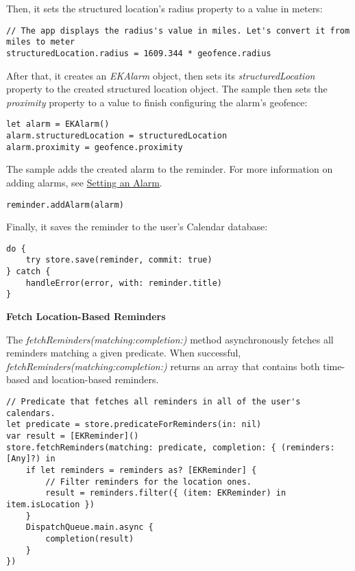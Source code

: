 \documentclass{article}
\begin{document}
Then, it sets the structured location's radius property to a value in meters:

\begin{verbatim}
// The app displays the radius's value in miles. Let's convert it from miles to meter
structuredLocation.radius = 1609.344 * geofence.radius
\end{verbatim}

After that, it creates an \textit{EKAlarm} object, then sets its \textit{structuredLocation} property to the created structured location object. The sample then sets the \textit{proximity} property to a value to finish configuring the alarm's geofence:

\begin{verbatim}
let alarm = EKAlarm()
alarm.structuredLocation = structuredLocation
alarm.proximity = geofence.proximity
\end{verbatim}

The sample adds the created alarm to the reminder. For more information on adding alarms, see \href{https://example.com}{Setting an Alarm}.

\begin{verbatim}
reminder.addAlarm(alarm)
\end{verbatim}

Finally, it saves the reminder to the user's Calendar database:

\begin{verbatim}
do {
    try store.save(reminder, commit: true)
} catch {
    handleError(error, with: reminder.title)
}
\end{verbatim}

\textbf{Fetch Location-Based Reminders}

The \textit{fetchReminders(matching:completion:)} method asynchronously fetches all reminders matching a given predicate. When successful, \textit{fetchReminders(matching:completion:)} returns an array that contains both time-based and location-based reminders.

\begin{verbatim}
// Predicate that fetches all reminders in all of the user's calendars.
let predicate = store.predicateForReminders(in: nil)
var result = [EKReminder]()
store.fetchReminders(matching: predicate, completion: { (reminders: [Any]?) in
    if let reminders = reminders as? [EKReminder] {
        // Filter reminders for the location ones.
        result = reminders.filter({ (item: EKReminder) in item.isLocation })
    }
    DispatchQueue.main.async {
        completion(result)
    }
})
\end{verbatim}
\end{document}
